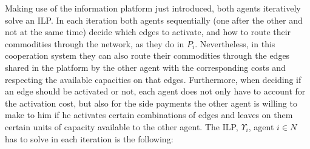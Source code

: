\documentclass{article}
\begin{document}
Making use of the information platform just introduced, both agents iteratively solve an ILP. In each iteration both agents sequentially (one after the other and not at the same time) decide which edges to activate, and how to route their commodities through the network, as they do in $P_i$. Nevertheless, in this cooperation system they can also route their commodities through the edges shared in the platform by the other agent with the corresponding costs and respecting the available capacities on that edges. Furthermore, when deciding if an edge should be activated or not, each agent does not only have to account for the activation cost, but also for the side payments the other agent is willing to make to him if he activates certain combinations of edges and leaves on them certain units of capacity available to the other agent. The ILP, $\Upsilon_i$, agent $i\in N$ has to solve in each iteration is the following:
\end{document}
